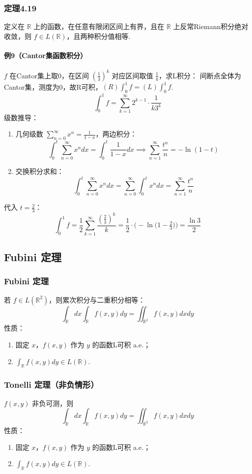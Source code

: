 \documentclass{article}
\begin{document}
	\subsubsection{定理4.19}
	定义在 $\mathbb{R}$ 上的函数，在任意有限闭区间上有界，且在 $\mathbb{R}$ 上反常Riemann积分绝对收敛，则 $f\in L(\mathbb{R})$，且两种积分值相等.
	
	\paragraph{例9（Cantor集函数积分）}
	$f$ 在Cantor集上取0，在区间 $(\tfrac13)^k$ 对应区间取值 $\tfrac1k$，求L积分：
	间断点全体为Cantor集，测度为0，故R可积，$(R)\int_0^1 f = (L)\int_0^1 f$.
	\[
	\int_0^1 f = \sum_{k=1}^\infty 2^{k-1}\cdot \frac{1}{k 3^k}
	\]
	级数推导：
	\begin{enumerate}
		\item 几何级数 $\displaystyle \sum_{n=0}^\infty x^n = \frac{1}{1-x}$，两边积分：
		\[
		\int_0^t \sum_{n=0}^\infty x^n dx
		= \int_0^t \frac{1}{1-x} dx
		\implies \sum_{n=1}^\infty \frac{t^n}{n} = -\ln(1-t)
		\]
		\item 交换积分求和：
		\[
		\int_0^t \sum_{n=0}^\infty x^n dx
		= \sum_{n=0}^\infty \int_0^t x^n dx
		= \sum_{n=1}^\infty \frac{t^n}{n}
		\]
	\end{enumerate}
	代入 $t=\tfrac23$：
	\[
	\int_0^1 f = \frac12 \sum_{k=1}^\infty \frac{(\tfrac23)^k}{k}
	= \frac12 \cdot \Big(-\ln\big(1-\tfrac23\big)\Big)
	= \frac{\ln 3}{2}
	\]
	
	\subsection{Fubini 定理}
	\subsubsection{Fubini 定理}
	若 $f\in L(\mathbb{R}^2)$，则累次积分与二重积分相等：
	\[
	\displaystyle \int_{\mathbb{R}} dx \int_{\mathbb{R}} f(x,y) dy
	= \iint_{\mathbb{R}^2} f(x,y) dxdy
	\]
	性质：
	\begin{enumerate}
		\item 固定 $x$，$f(x,y)$ 作为 $y$ 的函数L可积 a.e.；
		\item $\displaystyle \int_{\mathbb{R}} f(x,y) dy \in L(\mathbb{R})$.
	\end{enumerate}
	
	\subsubsection{Tonelli 定理（非负情形）}
	$f(x,y)$ 非负可测，则
	\[
	\displaystyle \int_{\mathbb{R}} dx \int_{\mathbb{R}} f(x,y) dy
	= \iint_{\mathbb{R}^2} f(x,y) dxdy
	\]
	性质：
	\begin{enumerate}
		\item 固定 $x$，$f(x,y)$ 作为 $y$ 的函数L可积 a.e.；
		\item $\displaystyle \int_{\mathbb{R}} f(x,y) dy \in L(\mathbb{R})$.
	\end{enumerate}
	
\end{document}
